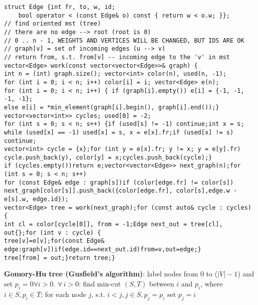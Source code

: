 \documentclass[a4paper,12pt]{article}
\begin{document}
\begin{verbatim}
struct Edge {int fr, to, w, id;
    bool operator < (const Edge& o) const { return w < o.w; }};
// find oriented mst (tree)
// there are no edge --> root (root is 0)
// 0 .. n - 1, WEIGHTS AND VERTICES WILL BE CHANGED, BUT IDS ARE OK
// graph[v] = set of incoming edges (u --> v)
// return from, s.t. from[v] -- incoming edge to the 'v' in mst
vector<Edge> work(const vector<vector<Edge>>& graph) {
int n = (int) graph.size(); vector<int> color(n), used(n, -1);
for (int i = 0; i < n; i++) color[i] = i; vector<Edge> e(n);
for (int i = 0; i < n; i++) { if (graph[i].empty()) e[i] = {-1, -1, -1, -1};
else e[i] = *min_element(graph[i].begin(), graph[i].end());}
vector<vector<int>> cycles; used[0] = -2;
for (int s = 0; s < n; s++) {if (used[s] != -1) continue;int x = s; 
while (used[x] == -1) used[x] = s, x = e[x].fr;if (used[x] != s) continue; 
vector<int> cycle = {x};for (int y = e[x].fr; y != x; y = e[y].fr) 
cycle.push_back(y), color[y] = x;cycles.push_back(cycle);}
if (cycles.empty())return e;vector<vector<Edge>> next_graph(n);for (int s = 0; s < n; s++)
for (const Edge& edge : graph[s])if (color[edge.fr] != color[s])
next_graph[color[s]].push_back({color[edge.fr], color[s],edge.w - e[s].w, edge.id});
vector<Edge> tree = work(next_graph);for (const auto& cycle : cycles) {
int cl = color[cycle[0]], from = -1;Edge next_out = tree[cl], out{};for (int v : cycle) {
tree[v]=e[v];for(const Edge& edge:graph[v])if(edge.id==next_out.id)from=v,out=edge;}
tree[from] = out;}return tree;}
\end{verbatim}

{\bf Gomory-Hu tree (Gusfield’s algorithm)}: label nodes from $0$ to ($|V| - 1$) and 
set $p_i=0 \forall i > 0$. $\forall\,i > 0$: find min-cut $(S, T)$ 
between $i$ and $p_i$, where $i \in S, p_i \in T$; 
for each node $j$, s.t. $i < j, j \in S, p_j=p_i$ set $p_j = i$
\end{document}
